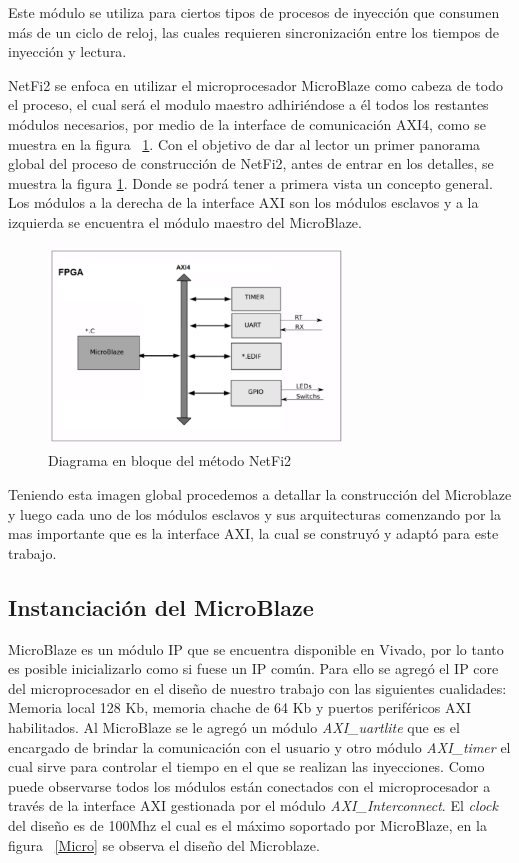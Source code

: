 \documentclass[a4paper,openright,12pt]{report}
\begin{document}
Este módulo se utiliza para ciertos tipos de procesos de inyección que consumen más de un ciclo de reloj, las cuales requieren sincronización entre los tiempos de inyección y lectura.


NetFi2 se enfoca en utilizar el microprocesador  MicroBlaze como cabeza de todo el proceso, el cual será el modulo maestro adhiriéndose a él todos los restantes módulos necesarios, por medio de la interface de comunicación AXI4, como se muestra en la figura ~\ref{FPGAs}.
Con el objetivo de dar al lector un primer panorama global del proceso de construcción de  NetFi2, antes de entrar en los detalles, se muestra la figura \ref{FPGAs}.  Donde se podrá tener a primera vista un  concepto general. Los módulos a la derecha de la interface AXI son los módulos esclavos y a la izquierda se encuentra el módulo maestro del MicroBlaze.

\begin{figure}[H]
	\centering
	\includegraphics[width=0.70\textwidth]{img/FPGA.png}
	\caption{Diagrama en bloque del método NetFi2}
	\label{FPGAs}
\end{figure}

Teniendo esta imagen global procedemos a detallar la construcción del Microblaze y luego cada uno de los módulos esclavos  y sus arquitecturas comenzando por la mas importante que es la interface AXI, la cual se construyó y adaptó para este trabajo.
 
 
\subsection{Instanciación del MicroBlaze}

MicroBlaze es un módulo IP que se encuentra disponible en Vivado, por lo tanto es posible inicializarlo como si fuese un IP común. Para ello se agregó el IP core del microprocesador en el diseño de nuestro trabajo con las siguientes cualidades: Memoria local 128 Kb, memoria chache de 64 Kb y puertos periféricos AXI habilitados.
Al MicroBlaze se le agregó un módulo \textit{AXI\_uartlite} que es el encargado de brindar la comunicación con el usuario y otro módulo \textit{AXI\_timer} el cual sirve para controlar el tiempo en el que se realizan las inyecciones. Como puede observarse todos los módulos están conectados con el microprocesador a través de la interface AXI gestionada por el módulo  \textit{AXI\_Interconnect}. El \textit{clock} del diseño es de 100Mhz el cual es el máximo soportado por MicroBlaze, en la figura ~\ref{Micro} se observa el diseño del Microblaze.
\end{document}
